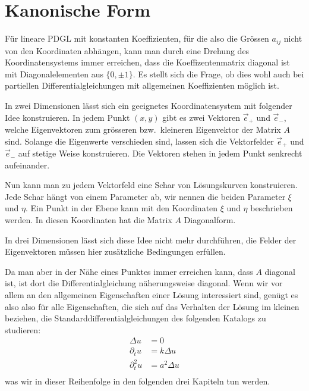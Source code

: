 \section{Kanonische Form}
Für lineare PDGL mit konstanten Koeffizienten, für die also die Grössen
$a_{ij}$ nicht von den Koordinaten abhängen, kann man durch eine Drehung
des Koordinatensystems immer erreichen, dass die Koeffizentenmatrix diagonal
ist mit Diagonalelementen aus $\{0,\pm1\}$. Es stellt sich die Frage, ob
dies wohl auch bei partiellen Differentialgleichungen mit allgemeinen
Koeffizienten möglich ist.

In zwei Dimensionen lässt sich ein geeignetes Koordinatensystem mit folgender
Idee konstruieren. 
In jedem Punkt $(x,y)$ gibt es zwei Vektoren $\vec e_+$ und
$\vec e_-$, welche Eigenvektoren zum grösseren bzw.~kleineren Eigenvektor
der Matrix $A$ sind. Solange die Eigenwerte verschieden sind, lassen sich
die Vektorfelder $\vec e_+$ und $\vec e_-$ auf stetige Weise konstruieren.
Die Vektoren stehen in jedem Punkt senkrecht aufeinander.

Nun kann man zu jedem Vektorfeld eine Schar von Lösungskurven
konstruieren. Jede Schar hängt von einem Parameter ab, wir nennen die
beiden Parameter $\xi$ und $\eta$. Ein Punkt in der Ebene kann mit
den Koordinaten $\xi$ und $\eta$ beschrieben werden.
In diesen Koordinaten hat die Matrix $A$ Diagonalform.

In drei Dimensionen lässt sich diese Idee nicht mehr durchführen,
die Felder der Eigenvektoren müssen hier zusätzliche Bedingungen
erfüllen.

Da man aber in der Nähe eines Punktes immer erreichen kann, dass $A$ diagonal
ist, ist dort die Differentialgleichung näherungsweise diagonal.
Wenn wir vor allem an den allgemeinen Eigenschaften einer Lösung interessiert
sind, genügt es also
also für alle Eigenschaften, die sich auf das Verhalten der Lösung im kleinen
beziehen, die Standarddifferentialgleichungen des folgenden Katalogs
zu studieren:
\begin{align*}
\Delta u&=0\\
\partial_tu&=k\Delta u\\
\partial_t^2u&=a^2\Delta u\\
\end{align*}
was wir in dieser Reihenfolge in den folgenden drei Kapiteln tun
werden.

